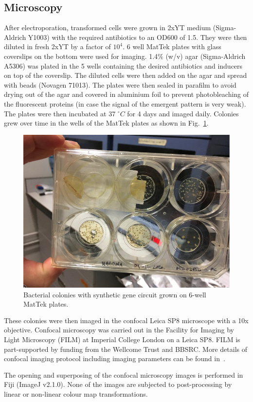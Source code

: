 \subsection{Microscopy}\label{microscopy}
After electroporation, transformed cells were grown in 2xYT medium (Sigma-Aldrich Y1003) with the required antibiotics to an OD600 of 1.5. They were then diluted in fresh 2xYT by a factor of $10^4$.
6 well MatTek plates with glass coverslips on the bottom were used for imaging.
1.4\% (w/v) agar (Sigma-Aldrich A5306) was plated in the 5 wells containing the desired antibiotics and inducers on top of the coverslip.
The diluted cells were then added on the agar and spread with beads (Novagen 71013).
The plates were then sealed in parafilm to avoid drying out of the agar and covered in aluminium foil to prevent photobleaching of the fluorescent proteins (in case the signal of the emergent pattern is very weak).
The plates were then incubated at 37 $^{\circ} C$ for 4 days and imaged daily.
Colonies grew over time in the wells of the MatTek plates as shown in Fig.~\ref{matek}.

\begin{figure}[H]

    \includegraphics[width=1\textwidth]{chapters/Methods/matek}
    \caption{Bacterial colonies with synthetic gene circuit grown on 6-well MatTek plates.}
    \label{matek}
\end{figure}

These colonies were then imaged in the confocal Leica SP8 microscope with a 10x objective.
Confocal microscopy was carried out in the Facility for Imaging by Light Microscopy (FILM) at Imperial College London on a Leica SP8.
FILM is part-supported by funding from the Wellcome Trust and BBSRC.
More details of confocal imaging protocol including imaging parameters can be found in~\parencite{Tica2020}.

The opening and superposing of the confocal microscopy images is performed in Fiji (ImageJ v2.1.0).
None of the images are subjected to post-processing by linear or non-linear colour map transformations.

